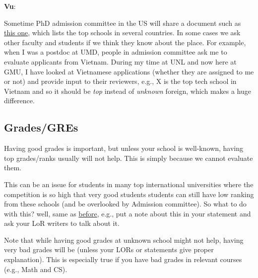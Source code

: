 \documentclass[11pt]{article}
\newenvironment{commentbox}[1][]{
\small
    \begin{cbox}
    \textbf{#1}: 
 }{
   \end{cbox}
}
\newcommand{\red}[1]{{\color{red}{#1}}}
\begin{document}
\begin{commentbox}[Vu]
Sometime PhD admission committee in the US will share a document such as \href{https://github.com/dynaroars/dynaroars.github.io/wiki/Foreign-Top-Schools}{this one}, which lists the top schools in several countries. In some cases we ask other faculty and students if we think they know about the place.  For example, when I was a postdoc at UMD, people in admission committee ask me to evaluate applicants from Vietnam.  During my time at UNL and now here at GMU, I have looked at Vietnamese applications (whether they are assigned to me or not) and provide input to their reviewers, e.g., X is the top tech school in Vietnam and so it should be \emph{top} instead of \emph{unknown} foreign, which makes a huge difference.
\end{commentbox}



\subsection{Grades/GREs}\label{sec:grades}


Having good grades is important, but unless your school is well-known, having top grades/ranks
usually will not help. This is simply because we cannot evaluate them.

This can be an issue for students in many top international universities where the competition is so high that very good students students can still have low ranking from these schools (and be overlooked by Admission committee).
So what to do with this? well, same as \hyperref[sec:your-school]{before}, e.g., put a note about this in your statement and ask your LoR writers to talk about it.

Note that while having good grades at unknown school might not help,
having very bad grades will be \red{red flag} (unless your LORs or
statements give proper explanation). This is especially true if you
have bad grades in relevant courses (e.g., Math and CS).
\end{document}
